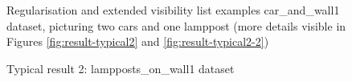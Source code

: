\begin{figure}[htb!]
{ }
 \caption{Regularisation and extended visibility list examples car\_and\_wall1 dataset, picturing two cars and one lamppost (more details visible in Figures \ref{fig:result-typical2} and \ref{fig:result-typical2-2})}
 \label{fig:extraresults}
\end{figure}

\begin{figure}[htb!]
 \centering
 \caption{Typical result 2: lampposts\_on\_wall1 dataset}
 \label{fig:result-typical1}
\end{figure}
